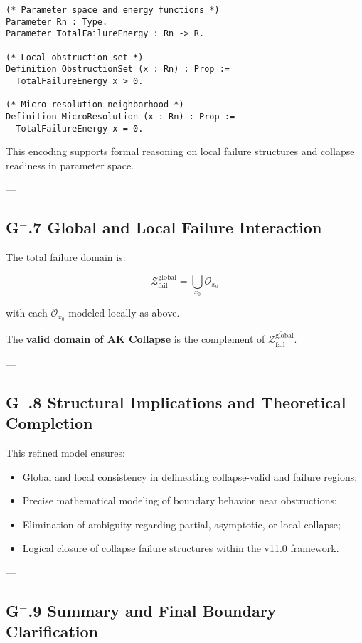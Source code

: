 \documentclass[11pt]{article}
\begin{document}
\begin{lstlisting}[language=Coq]
(* Parameter space and energy functions *)
Parameter Rn : Type.
Parameter TotalFailureEnergy : Rn -> R.

(* Local obstruction set *)
Definition ObstructionSet (x : Rn) : Prop :=
  TotalFailureEnergy x > 0.

(* Micro-resolution neighborhood *)
Definition MicroResolution (x : Rn) : Prop :=
  TotalFailureEnergy x = 0.
\end{lstlisting}

This encoding supports formal reasoning on local failure structures and collapse readiness in parameter space.

---

\subsection*{G$^{+}$.7 Global and Local Failure Interaction}

The total failure domain is:

\[
\mathcal{Z}_{\mathrm{fail}}^{\mathrm{global}} = \bigcup_{x_0} \mathcal{O}_{x_0}
\]

with each $\mathcal{O}_{x_0}$ modeled locally as above.

The \textbf{valid domain of AK Collapse} is the complement of $\overline{\mathcal{Z}_{\mathrm{fail}}^{\mathrm{global}}}$.

---

\subsection*{G$^{+}$.8 Structural Implications and Theoretical Completion}

This refined model ensures:

\begin{itemize}
    \item Global and local consistency in delineating collapse-valid and failure regions;
    \item Precise mathematical modeling of boundary behavior near obstructions;
    \item Elimination of ambiguity regarding partial, asymptotic, or local collapse;
    \item Logical closure of collapse failure structures within the v11.0 framework.
\end{itemize}

---

\subsection*{G$^{+}$.9 Summary and Final Boundary Clarification}
\end{document}
